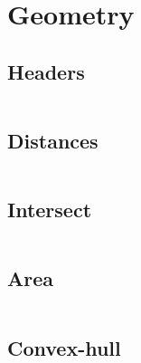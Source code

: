 \section{Geometry}
\subsection{Headers}
\inputminted[frame=single,framesep=3pt,breaklines=true,tabsize=2,linenos]{c++}{geometry/geometry.h}

\subsection{Distances}
\inputminted[frame=single,framesep=3pt,breaklines=true,tabsize=2,linenos,label=O(1)]{c++}{geometry/distance.cpp}

\subsection{Intersect}
\inputminted[frame=single,framesep=3pt,breaklines=true,tabsize=2,linenos,label=O(1)]{c++}{geometry/intersect.cpp}

\subsection{Area}
\inputminted[frame=single,framesep=3pt,breaklines=true,tabsize=2,linenos,label=O(N)]{c++}{geometry/area.cpp}

\subsection{Convex-hull}
\inputminted[frame=single,framesep=3pt,breaklines=true,tabsize=2,linenos,label=O(N log(N))]{c++}{geometry/convex-hull.cpp}